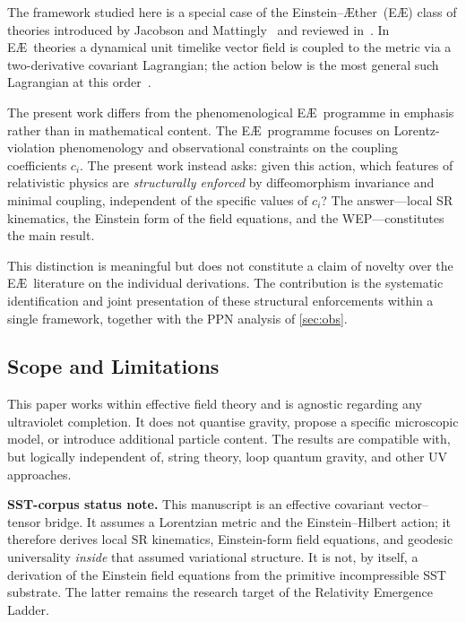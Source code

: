 \documentclass[12pt,a4paper]{article}
\newcommand{\Aether}{\AE ther}
\begin{document}
The framework studied here is a special case of the Einstein--\Aether\ (E\AE)
class of theories introduced by Jacobson and Mattingly~\citep{jacobson2001}
and reviewed in~\citep{jacobson2008}. In E\AE\ theories a dynamical unit
timelike vector field is coupled to the metric via a two-derivative covariant
Lagrangian; the action below is the most general such Lagrangian at this
order~\citep{jacobson2001}.

The present work differs from the phenomenological E\AE\ programme in
emphasis rather than in mathematical content. The E\AE\ programme focuses on
Lorentz-violation phenomenology and observational constraints on the coupling
coefficients $c_i$. The present work instead asks: given this action, which
features of relativistic physics are \emph{structurally enforced} by
diffeomorphism invariance and minimal coupling, independent of the specific
values of $c_i$? The answer---local SR kinematics, the Einstein form of the
field equations, and the WEP---constitutes the main result.

This distinction is meaningful but does not constitute a claim of novelty over
the E\AE\ literature on the individual derivations. The contribution is the
systematic identification and joint presentation of these structural
enforcements within a single framework, together with the PPN analysis of
\cref{sec:obs}.

\subsection{Scope and Limitations}

This paper works within effective field theory and is agnostic regarding any
ultraviolet completion. It does not quantise gravity, propose a specific
microscopic model, or introduce additional particle content. The results are
compatible with, but logically independent of, string theory, loop quantum
gravity, and other UV approaches.


\begin{mdframed}[backgroundcolor=gray!8]
\noindent\textbf{SST-corpus status note.}
This manuscript is an effective covariant vector--tensor bridge.  It assumes a
Lorentzian metric and the Einstein--Hilbert action; it therefore derives local
SR kinematics, Einstein-form field equations, and geodesic universality
\emph{inside} that assumed variational structure.  It is not, by itself, a
derivation of the Einstein field equations from the primitive incompressible
SST substrate.  The latter remains the research target of the Relativity
Emergence Ladder.
\end{mdframed}
\end{document}
